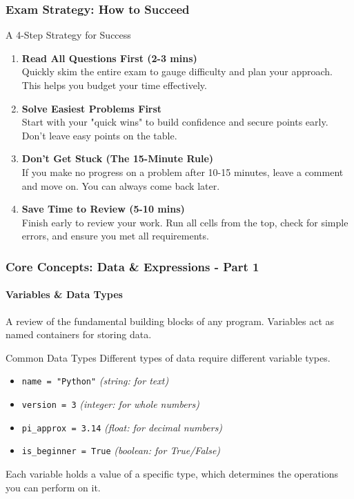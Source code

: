 \documentclass{beamer}
\begin{document}
\begin{frame}[fragile]
    \frametitle{Exam Strategy: How to Succeed}

    \begin{block}{A 4-Step Strategy for Success}
        \begin{enumerate}
            \item \textbf{Read All Questions First (2-3 mins)} \\
            Quickly skim the entire exam to gauge difficulty and plan your approach. This helps you budget your time effectively.

            \item \textbf{Solve Easiest Problems First} \\
            Start with your "quick wins" to build confidence and secure points early. Don't leave easy points on the table.

            \item \textbf{Don't Get Stuck (The 15-Minute Rule)} \\
            If you make no progress on a problem after 10-15 minutes, leave a comment and move on. You can always come back later.

            \item \textbf{Save Time to Review (5-10 mins)} \\
            Finish early to review your work. Run all cells from the top, check for simple errors, and ensure you met all requirements.
        \end{enumerate}
    \end{block}
\end{frame}

\begin{frame}[fragile]
    \frametitle{Core Concepts: Data \& Expressions - Part 1}
    \framesubtitle{Variables \& Data Types}
    
    A review of the fundamental building blocks of any program. Variables act as named containers for storing data.
    
    \begin{block}{Common Data Types}
        Different types of data require different variable types.
        \begin{itemize}
            \item \texttt{name = "Python"} \hfill \textit{(string: for text)}
            \item \texttt{version = 3} \hfill \textit{(integer: for whole numbers)}
            \item \texttt{pi\_approx = 3.14} \hfill \textit{(float: for decimal numbers)}
            \item \texttt{is\_beginner = True} \hfill \textit{(boolean: for True/False)}
        \end{itemize}
    \end{block}
    
    Each variable holds a value of a specific type, which determines the operations you can perform on it.
\end{frame}
\end{document}
